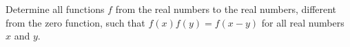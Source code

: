 Determine all functions $f$ from the real numbers to the real numbers, different from the zero function, such that $f(x)f(y)=f(x-y)$ for all real numbers $x$ and $y$.